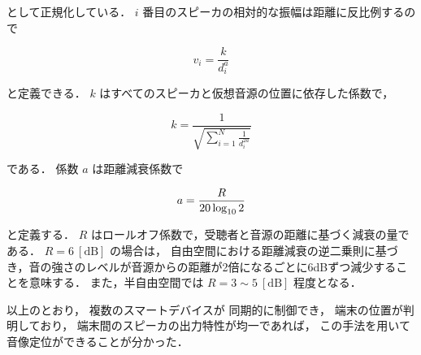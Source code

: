 として正規化している．
$i$ 番目のスピーカの相対的な振幅は距離に反比例するので

$$
v_i = \frac{k}{d_i^a}
$$

と定義できる．
$k$ はすべてのスピーカと仮想音源の位置に依存した係数で，

$$
k = \frac{1}{\sqrt{\sum_{i=1}^N \frac{1}{d_i^{2a}}}}
$$

である．
係数 $a$ は距離減衰係数で

$$
a = \frac{R}{20 \log_{10}2} \\
$$

と定義する．
$R$ はロールオフ係数で，受聴者と音源の距離に基づく減衰の量である．
$R=6\ [\mathrm{dB}]$ の場合は，
自由空間における距離減衰の逆二乗則に基づき，音の強さのレベルが音源からの距離が2倍になるごとに6dBずつ減少することを意味する．
また，半自由空間では $R=3\sim5\ [\mathrm{dB}]$ 程度となる．

以上のとおり，
複数のスマートデバイスが
同期的に制御でき，
端末の位置が判明しており，
端末間のスピーカの出力特性が均一であれば，
この手法を用いて音像定位ができることが分かった．
